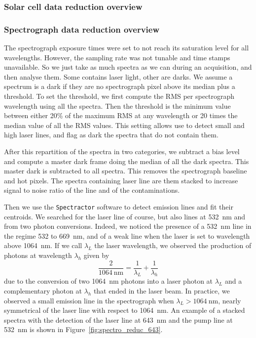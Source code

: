 \documentclass[onecolumn]{aa}
\begin{document}
\subsubsection{Solar cell data reduction overview}

\subsubsection{Spectrograph data reduction overview}

The spectrograph exposure times were set to not reach its saturation level for all wavelengths. However, the sampling rate was not tunable and time stamps unavailable. So we just take as much spectra as we can during an acquisition, and then analyse them. Some contains laser light, other are darks. We assume a spectrum is a dark if they are no spectrograph pixel above its median plus a threshold. To set the threshold, we first compute the RMS per spectrograph wavelength using all the spectra. Then the threshold is the minimum value between either 20\% of the maximum RMS at any wavelength or 20 times the median value of all the RMS values. This setting allows use to detect small and high laser lines, and flag as dark the spectra that do not contain them.

After this repartition of the spectra in two categories, we subtract a bias level and compute a master dark frame doing the median of all the dark spectra. This master dark is subtracted to all spectra. This removes the spectrograph baseline and hot pixels. The spectra containing laser line are them stacked to increase signal to noise ratio of the line and of the contaminations.

Then we use the \texttt{Spectractor} software to detect emission lines and fit their centroids. We searched for the laser line of course, but also lines at \SI{532}{\nm} and from two photon conversions. Indeed, we noticed the presence of a \SI{532}{\nm} line in the regime 532 to \SI{669}{\nm}, and of a weak line when the laser is set to wavelength above \SI{1064}{\nm}. If we call $\lambda_L$ the laser wavelength, we observed the production of photons at wavelength $\lambda_h$ given by
\begin{equation}
 \frac{2}{\SI{1064}{\nm}} = \frac{1}{\lambda_L} + \frac{1}{\lambda_h}
 \end{equation} 
due to the conversion of two \SI{1064}{\nm} photons into a laser photon at $\lambda_L$ and a complementary photon at $\lambda_h$ that ended in the laser beam. In practice, we observed a small emission line in the spectrograph when $\lambda_L > \SI{1064}{\nm}$, nearly symmetrical of the laser line with respect to \SI{1064}{\nm}. An example of a stacked spectra with the detection of the laser line at \SI{643}{\nm} and the pump line at \SI{532}{\nm} is shown in Figure~\ref{fig:spectro_reduc_643}.
\end{document}
